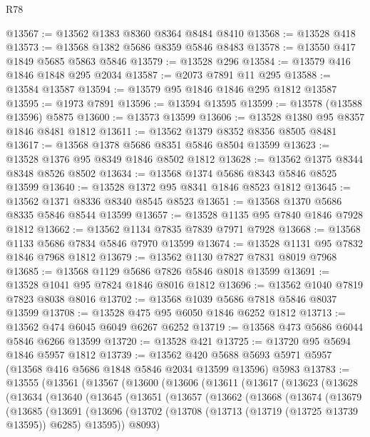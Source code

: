 \begin{lexlean}{R78}
\begin{coremodule}
@13567 := @13562 @1383 @8360 @8364 @8484 @8410
@13568 := @13528 @418
@13573 := @13568 @1382 @5686 @8359 @5846 @8483
@13578 := @13550 @417 @1849 @5685 @5863 @5846
@13579 := @13528 @296
@13584 := @13579 @416 @1846 @1848 @295 @2034
@13587 := @2073 @7891 @11 @295
@13588 := @13584 @13587
@13594 := @13579 @95 @1846 @1846 @295 @1812 @13587
@13595 := @1973 @7891
@13596 := @13594 @13595
@13599 := @13578 (@13588 @13596) @5875
@13600 := @13573 @13599
@13606 := @13528 @1380 @95 @8357 @1846 @8481 @1812
@13611 := @13562 @1379 @8352 @8356 @8505 @8481
@13617 := @13568 @1378 @5686 @8351 @5846 @8504 @13599
@13623 := @13528 @1376 @95 @8349 @1846 @8502 @1812
@13628 := @13562 @1375 @8344 @8348 @8526 @8502
@13634 := @13568 @1374 @5686 @8343 @5846 @8525 @13599
@13640 := @13528 @1372 @95 @8341 @1846 @8523 @1812
@13645 := @13562 @1371 @8336 @8340 @8545 @8523
@13651 := @13568 @1370 @5686 @8335 @5846 @8544 @13599
@13657 := @13528 @1135 @95 @7840 @1846 @7928 @1812
@13662 := @13562 @1134 @7835 @7839 @7971 @7928
@13668 := @13568 @1133 @5686 @7834 @5846 @7970 @13599
@13674 := @13528 @1131 @95 @7832 @1846 @7968 @1812
@13679 := @13562 @1130 @7827 @7831 @8019 @7968
@13685 := @13568 @1129 @5686 @7826 @5846 @8018 @13599
@13691 := @13528 @1041 @95 @7824 @1846 @8016 @1812
@13696 := @13562 @1040 @7819 @7823 @8038 @8016
@13702 := @13568 @1039 @5686 @7818 @5846 @8037 @13599
@13708 := @13528 @475 @95 @6050 @1846 @6252 @1812
@13713 := @13562 @474 @6045 @6049 @6267 @6252
@13719 := @13568 @473 @5686 @6044 @5846 @6266 @13599
@13720 := @13528 @421
@13725 := @13720 @95 @5694 @1846 @5957 @1812
@13739 := @13562
    @420
    @5688
    @5693
    @5971
    @5957
    (@13568 @416 @5686 @1848 @5846 @2034 @13599 @13596)
    @5983
@13783 := @13555
    (@13561
      (@13567
        (@13600
          (@13606
            (@13611
              (@13617
                (@13623
                  (@13628
                    (@13634
                      (@13640
                        (@13645
                          (@13651
                            (@13657
                              (@13662
                                (@13668
                                  (@13674
                                    (@13679
                                      (@13685
                                        (@13691
                                          (@13696
                                            (@13702
                                              (@13708
                                                (@13713 (@13719 (@13725 @13739 @13595)) @6285)
                                                @13595))
                                            @8093)

\end{coremodule}
\end{lexlean}
